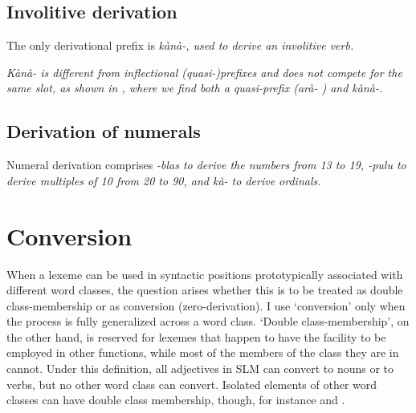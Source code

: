 %
%

\subsection{Involitive derivation}\label{sec:wofo:Involitivederivation}
The only derivational prefix is \em kànà-\em, used to derive an involitive verb.


\em Kànà- \em is different from inflectional (quasi-)prefixes and does not compete for the same slot, as shown in , where we find both a quasi-prefix (\em arà- \em) and \em kànà-\em.




\subsection{Derivation of numerals}\label{sec:wofo:Derivationofnumerals}
Numeral derivation comprises \em -blas \em to derive the numbers from 13 to 19, \em -pulu \em to derive  multiples of 10 from 20 to 90, and \em kà- \em to derive ordinals.





\section{Conversion}\label{sec:wofo:Conversion}
When a lexeme can be used in syntactic positions prototypically associated with different word classes, the question arises whether this is to be treated as double class-membership or as conversion (zero-derivation). I use `conversion'  only  when the process is fully generalized across a word class. `Double class-membership', on the other hand, is reserved for lexemes that happen to have the facility to  be employed in other functions, while most of the members of the class they are in cannot. Under this definition, all adjectives  in SLM can convert to nouns or to verbs, but no other word class can convert. Isolated elements of other word classes can have double class membership, though, for instance  and .

